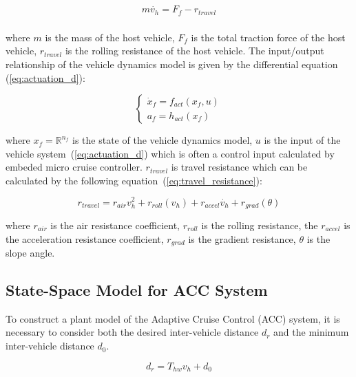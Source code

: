 \documentclass{article}
\numberwithin{equation}{section}
\begin{document}
\begin{equation}
    \begin{aligned}
        m\dot{v_h}=F_f-r_{travel}\label{eq:logitudinal_d} \\
    \end{aligned}
\end{equation}

\noindent where $m$ is the mass of the host vehicle, $F_f$ is the total traction force of the host vehicle,
$r_{travel}$ is the rolling resistance of the host vehicle. The input/output relationship of
the vehicle dynamics model is given by the differential equation (\ref{eq:actuation_d}):

\begin{equation}
    \left\{\begin{array}{l}\label{eq:actuation_d}
        \dot{x}_{f}=f_{a c t}\left(x_{f}, u\right) \\
        a_{f}=h_{a c t}\left(x_{f}\right)
    \end{array}\right.
\end{equation}

\noindent where $x_f=\mathbb{R}^{n_{f}}$ is the state of the vehicle dynamics model, $u$ is the input of the
vehicle system~(\ref{eq:actuation_d}) which is often a control input calculated by embeded
micro cruise controller. $r_{travel}$ is travel resistance which can be calculated by the
following equation~(\ref{eq:travel_resistance}):

\begin{equation}
    r_{travel}=r_{air}v_h^2 + r_{roll}(v_h)+r_{accel}\dot{v_h}+r_{grad}(\theta)\label{eq:travel_resistance}
\end{equation}

\noindent where $r_{air}$ is the air resistance coefficient, $r_{roll}$ is the rolling resistance,
the $r_{accel}$ is the acceleration resistance coefficient, $r_{grad}$ is the gradient resistance,
$\theta$ is the slope angle.

\subsection{State-Space Model for ACC System}

To construct a plant model of the Adaptive Cruise Control (ACC) system, it is
necessary to consider both the desired inter-vehicle distance $d_r$ and the
minimum inter-vehicle distance $d_0$.

\begin{equation}
    d_r = T_{hw}v_h+d_0\label{eq:inter_vehicle_distance}
\end{equation}
\end{document}
